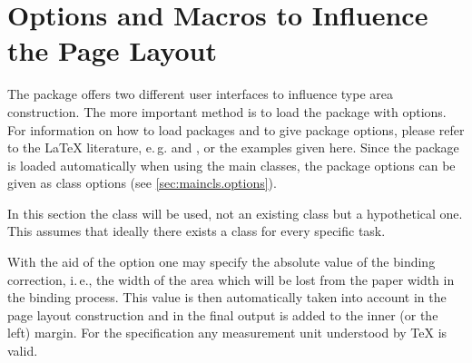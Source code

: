 
\section{Options and Macros to Influence the Page Layout}

The package  offers two different user interfaces to
influence type area construction. The more important method is to load
the package with options. For information on how to load packages and
to give package options, please refer to the {\LaTeX} literature,
e.\,g.  \cite{lshort} and \cite{latex:usrguide}, or the examples given
here.  Since the  package is loaded automatically
when using the {\KOMAScript} main classes, the package options can be
given as class options (see \autoref{sec:maincls.options}).

In this section the  class will be used, not an
existing {\KOMAScript} class but a hypothetical one. This assumes that ideally there exists a class for
every specific task.

\begin{Declaration}
\end{Declaration}%
With the aid of the option
one may specify the absolute value of the binding
correction, i.\,e., the width of the area
which will be lost from the paper width in the binding process. This
value is then automatically taken into account in the page layout
construction and in the final output is added to the inner (or the
left) margin. For the  specification any measurement
unit understood by \TeX{} is valid.

